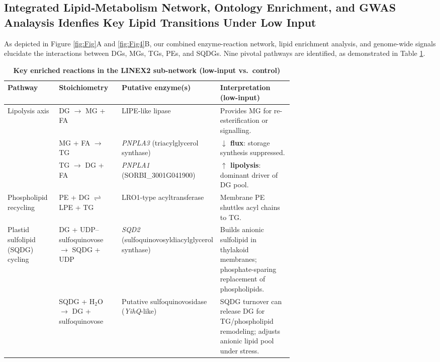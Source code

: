 \documentclass[10pt,letterpaper]{article}
\begin{document}
\subsection*{Integrated Lipid‐Metabolism Network, Ontology Enrichment, and GWAS Analaysis Idenfies Key Lipid Transitions Under Low Input}

As depicted in Figure \ref{fig:Fig}A and \ref{fig:Fig4}B, our combined enzyme-reaction network, lipid enrichment analysis, and genome-wide signals elucidate the interactions between DGs, MGs, TGs, PEs, and SQDGs. Nine pivotal pathways are identified, as demonstrated in Table \ref{tab:linex_reactions}.

\begin{table}[!ht]
  \centering
  \footnotesize
  \setlength{\tabcolsep}{4pt}
  \renewcommand{\arraystretch}{1.2}
  \caption{\textbf{Key enriched reactions in the LINEX2 sub-network (low-input vs.\ control)}}
  \label{tab:linex_reactions}
  \begin{tabularx}{\linewidth}{@{}%
      p{0.18\linewidth}
      p{0.22\linewidth}
      p{0.26\linewidth}
      X
    @{}}
    \toprule
    \textbf{Pathway} & \textbf{Stoichiometry} & \textbf{Putative enzyme(s)} & \textbf{Interpretation (low-input)} \\
    \midrule
    Lipolysis axis
      & DG $\rightarrow$ MG + FA
      & LIPE-like lipase
      & Provides MG for re-esterification or signalling. \\
    & MG + FA $\rightarrow$ TG
      & \textit{PNPLA3} (triacylglycerol synthase)
      & \textbf{$\downarrow$ flux}: storage synthesis suppressed. \\
    & TG $\rightarrow$ DG + FA
      & \textit{PNPLA1} (SORBI\_3001G041900)
      & \textbf{$\uparrow$ lipolysis}: dominant driver of DG pool. \\
    \addlinespace
    Phospholipid recycling
      & PE + DG $\rightleftharpoons$ LPE + TG
      & LRO1-type acyltransferase
      & Membrane PE shuttles acyl chains to TG. \\
    \addlinespace
    Plastid sulfolipid (SQDG) cycling
      & DG + UDP–sulfoquinovose $\rightarrow$ SQDG + UDP
      & \textit{SQD2} (sulfoquinovosyldiacylglycerol synthase)
      & Builds anionic sulfolipid in thylakoid membranes; phosphate-sparing replacement of phospholipids. \\
    & SQDG + H$_2$O $\rightarrow$ DG + sulfoquinovose
      & Putative sulfoquinovosidase (\textit{YihQ}-like)
      & SQDG turnover can release DG for TG/phospholipid remodeling; adjusts anionic lipid pool under stress. \\

\end{tabularx}
\end{table}
\end{document}
